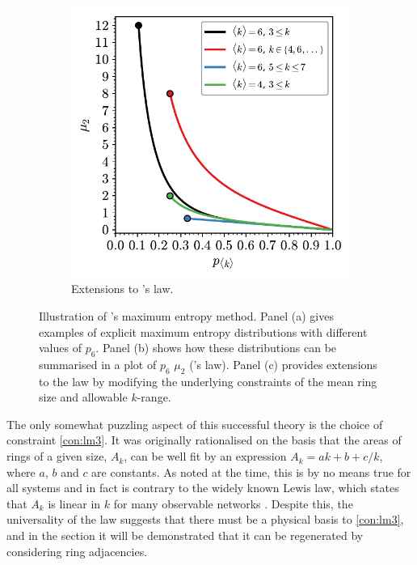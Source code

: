 \begin{figure}[h]
      \begin{subfigure}[b]{0.45\textwidth}
         \centering
         \includegraphics[width=\textwidth]{./figures/methods/lm_3.pdf}
         \caption{Extensions to \lm's law.}
         \label{fig:lm3}
     \end{subfigure}
     \hfill

    
     \caption{Illustration of \lm's maximum entropy method. Panel (a) gives examples of explicit maximum entropy distributions with different values of $p_6$. Panel (b) shows how these distributions can be summarised in a plot of $p_6$ \vs{} $\mu_2$ (\lm's law). Panel (c) provides extensions to the law by modifying the underlying constraints of the mean ring size and allowable $k$\--range.}
     \label{fig:lm}
\end{figure}

The only somewhat puzzling aspect of this successful theory is the choice of constraint \eqref{con:lm3}.
It was originally rationalised on the basis that the areas of rings of a given size, $A_k$, can be well fit by an expression $A_k = ak+b+c/k$, where $a$, $b$ and $c$ are constants.
As noted at the time, this is by no means true for all systems and in fact is contrary to the widely known Lewis law, which states that $A_k$ is linear in $k$ for many observable networks \cite{Lewis1928,Fortes1995,Kim2014}.
Despite this, the universality of the \lm{} law suggests that there must be a physical basis to \eqref{con:lm3}, and in the section  it will be demonstrated that it can be regenerated by considering ring adjacencies.

